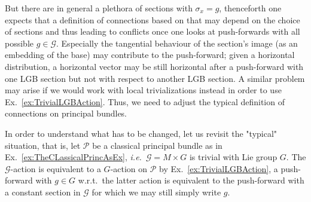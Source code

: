 \documentclass[a4paper,oneside,11pt,bibliography=totoc]{scrartcl}
\theoremstyle{plain}
\theoremstyle{remark}
\theoremstyle{definition}
\begin{document}
\begin{center}
\end{center}

But there are in general a plethora of sections with $\sigma_x= g$, thenceforth one expects that a definition of connections based on that may depend on the choice of sections and thus leading to conflicts once one looks at push-forwards with all possible $g \in \mathcal{G}$. Especially the tangential behaviour of the section's image (as an embedding of the base) may contribute to the push-forward; given a horizontal distribution, a horizontal vector may be still horizontal after a push-forward with one LGB section but not with respect to another LGB section. A similar problem may arise if we would work with local trivializations instead in order to use Ex.\ \ref{ex:TrivialLGBAction}. Thus, we need to adjust the typical definition of connections on principal bundles.

In order to understand what has to be changed, let us revisit the "typical" situation, that is, let $\mathcal{P}$ be a classical principal bundle as in Ex.\ \ref{ex:TheCLassicalPrincAsEx}, \textit{i.e.}\ $\mathcal{G} = M \times G$ is trivial with Lie group $G$. The $\mathcal{G}$-action is equivalent to a $G$-action on $\mathcal{P}$ by Ex.\ \ref{ex:TrivialLGBAction}, a push-forward with $g \in G$ w.r.t.\ the latter action is equivalent to the push-forward with a constant section in $\mathcal{G}$ for which we may still simply write $g$.
\end{document}
